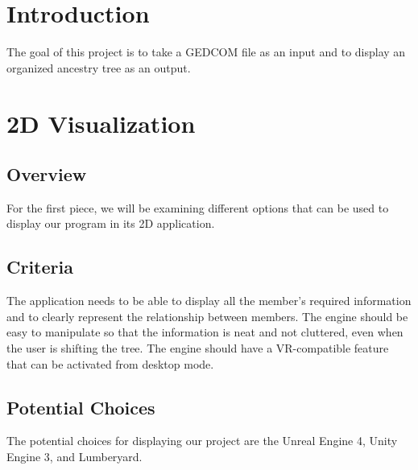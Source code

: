 \documentclass[onecolumn, draftclsnofoot,10pt, compsoc]{IEEEtran}
\begin{document}


\section{Introduction}
The goal of this project is to take a GEDCOM file as an input and to display an organized ancestry tree as an output. 

\section{2D Visualization}
\subsection{Overview}
\begin{singlespace}
For the first piece, we will be examining different options that can be used to display our program in its 2D application. 
\end{singlespace}




\subsection{Criteria}
\begin{singlespace}
The application needs to be able to display all the member’s required information and to clearly represent the relationship between members. The engine should be easy to manipulate so that the information is neat and not cluttered, even when the user is shifting the tree. The engine should have a VR-compatible feature that can be activated from desktop mode.  
\end{singlespace}

\subsection{Potential Choices}
\begin{singlespace}
The potential choices for displaying our project are the Unreal Engine 4, Unity Engine 3, and Lumberyard.  
\end{singlespace}
\end{document}
